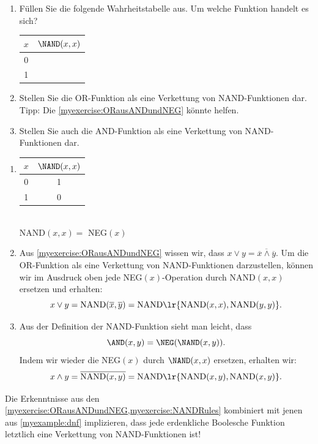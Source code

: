 \begin{myexercise}\label{myexercise:NANDRules}
    \begin{enumerate}
        \item Füllen Sie die folgende Wahrheitstabelle aus. Um welche Funktion handelt es sich?
        \begin{center}
            \begin{tabular}{c||c}
                $x$&$\NAND(x,x)$ \\
                \hline
                0& \\
                1&
            \end{tabular}
        \end{center}
        \item Stellen Sie die OR-Funktion als eine Verkettung von NAND-Funktionen dar. Tipp: Die \cref{myexercise:ORausANDundNEG} könnte helfen.
        \item Stellen Sie auch die AND-Funktion als eine Verkettung von NAND-Funktionen dar.
    \end{enumerate}
    \begin{myanswer}
        \begin{enumerate}
        \item \begin{tabular}{c||c}
                    $x$&$\NAND(x,x)$ \\
                    \hline
                    0&1 \\
                    1&0
            \end{tabular} \\
            NAND$(x,x) =$ NEG$(x)$
            \item Aus \cref{myexercise:ORausANDundNEG} wissen wir, dass $x \vee y = \overline {\overline{x} \wedge \overline{y}}$. Um die OR-Funktion als eine Verkettung von NAND-Funktionen darzustellen, können wir im Ausdruck oben jede NEG$(x)$-Operation durch NAND$(x,x)$ ersetzen und erhalten:
            $$x\vee y = \mathrm{NAND} (\overline{x}, \overline{y}) = \mathrm{NAND} \lr{\mathrm{NAND}(x,x), \mathrm{NAND}(y,y)}.$$
            \item Aus der Definition der NAND-Funktion sieht man leicht, dass $$\AND(x,y) = \NEG(\NAND(x,y)).$$ Indem wir wieder die NEG$(x)$ durch $\NAND(x,x)$ ersetzen, erhalten wir:
            $$x \wedge y = \overline{\mathrm{NAND}(x,y)} =\mathrm{NAND}\lr{\mathrm{NAND}(x,y), \mathrm{NAND}(x,y)}. $$
        \end{enumerate}
    \end{myanswer}
\end{myexercise}
Die Erkenntnisse aus den \cref{myexercise:ORausANDundNEG,myexercise:NANDRules} kombiniert mit jenen aus \cref{myexample:dnf} implizieren, dass jede erdenkliche Boolesche Funktion letztlich eine Verkettung von NAND-Funktionen ist! 


